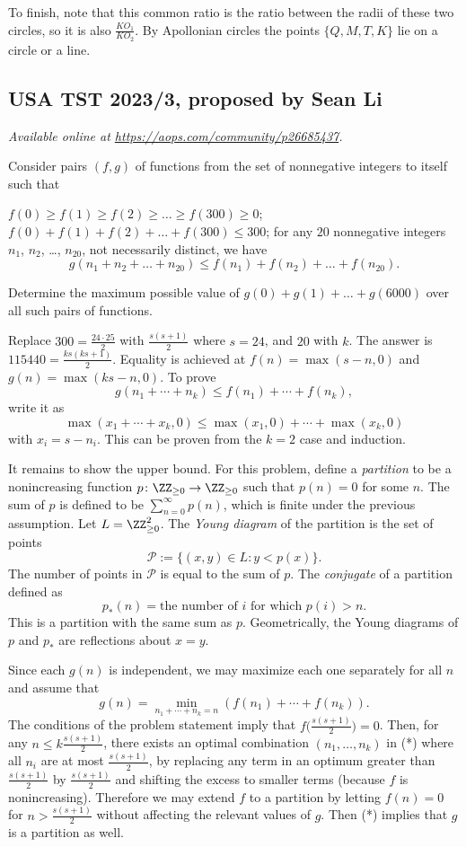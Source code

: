 \documentclass[11pt]{scrartcl}
\begin{document}
To finish, note that this common ratio is the ratio between the radii
of these two circles, so it is also $\frac{KO_1}{KO_2}$.
By Apollonian circles the points $\{Q,M,T,K\}$ lie on a circle or a line.
\pagebreak

\subsection{USA TST 2023/3, proposed by Sean Li}
\textsl{Available online at \url{https://aops.com/community/p26685437}.}
\begin{mdframed}[style=mdpurplebox,frametitle={Problem statement}]
Consider pairs $(f,g)$ of functions
from the set of nonnegative integers to itself such that
\begin{itemize}
		\ii $f(0) \ge f(1) \ge f(2) \ge \dots \ge f(300) \ge 0$;
		\ii $f(0) + f(1) + f(2) + \dots + f(300) \leq 300$;
		\ii for any $20$ nonnegative integers $n_1$, $n_2$, \dots, $n_{20}$,
		not necessarily distinct, we have
		\[ g(n_1 + n_2 + \dots + n_{20}) \leq f(n_1) + f(n_2) + \dots + f(n_{20}). \]
\end{itemize}
Determine the maximum possible value of $g(0) + g(1) + \dots + g(6000)$
over all such pairs of functions.
\end{mdframed}
Replace $300 = \frac{24 \cdot 25}{2}$ with $\frac{s(s+1)}{2}$ where $s=24$, and
$20$ with $k$. The answer is $115440 = \frac{ks(ks+1)}{2}$. Equality is achieved
at $f(n) = \max (s-n, 0)$ and $g(n) = \max (ks-n,0)$. To prove
\[g(n_1+\dotsb+n_k)\leq f(n_1)+\dotsb+f(n_k),\]
write it as
\[\max(x_1+\dotsb+x_k, 0)\leq \max(x_1, 0)+\dotsb+\max(x_k, 0)\]
with $x_i=s-n_i$. This can be proven from the $k=2$ case and induction.

\medskip

It remains to show the upper bound. For this problem, define a \emph{partition}
to be a nonincreasing function $p \colon \ZZ_{\geq 0}\to \ZZ_{\geq 0}$
such that $p(n)=0$ for some $n$. The sum of $p$ is defined to be
$\sum_{n=0}^{\infty}p(n)$, which is finite under the previous assumption. Let
$L=\ZZ_{\geq 0}^2$. The
\emph{Young diagram} of the partition is the set of points
\[\mathcal{P} := \{(x, y)\in L: y < p(x)\}.\]
The number of points in $\mathcal{P}$ is equal to the sum of $p$.
The \emph{conjugate} of a partition defined as
\[p_*(n) = \text{the number of $i$ for which $p(i) > n$}.\]
This is a partition with the same sum as $p$. Geometrically, the Young diagrams
of $p$ and $p_*$ are reflections about $x=y$.

Since each $g(n)$ is independent, we may
maximize each one separately for all $n$ and assume that
\[
  g(n) = \min_{n_1+\dotsb+n_k=n}(f(n_1)+\dotsb+f(n_k)) \tag{*}.
\]
The conditions of the problem statement imply that $f\big(\tfrac{s(s+1)}{2}\big)=0$.
Then, for any $n\leq k\frac{s(s+1)}{2}$, there exists an optimal combination
$(n_1, \dots, n_k)$ in (*) where all $n_i$ are at most $\frac{s(s+1)}{2}$, by
replacing any term in an optimum greater than $\frac{s(s+1)}{2}$ by
$\frac{s(s+1)}{2}$ and shifting the excess to smaller terms (because $f$ is
nonincreasing). Therefore we may extend $f$ to a partition by letting $f(n) = 0$
for $n > \frac{s(s+1)}{2}$ without affecting the relevant values of $g$. Then
(*) implies that $g$ is a partition as well.
\end{document}
